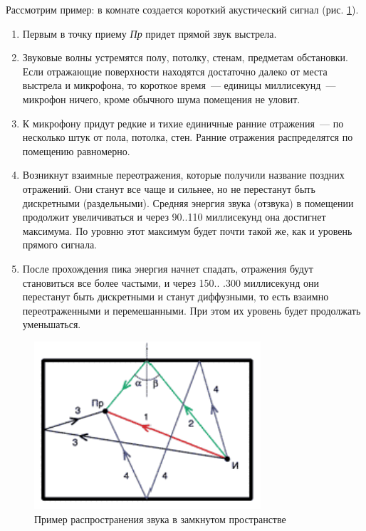 \documentclass[oneside, final, 14pt]{extreport}
\begin{document}
Рассмотрим пример: в комнате создается короткий акустический сигнал (рис. \ref{pic-acoustic-01}).
\begin{enumerate}
  \item Первым в точку приему \emph{Пр} придет прямой звук выстрела.
  \item Звуковые волны устремятся полу, потолку, стенам, предметам обстановки. Если отражающие поверхности находятся достаточно далеко от места выстрела и микрофона, то короткое время~--- единицы миллисекунд~--- микрофон ничего, кроме обычного шума помещения не уловит.
  \item К микрофону придут редкие и тихие единичные ранние отражения~--- по несколько штук от пола, потолка, стен. Ранние отражения распределятся по помещению равномерно.
  \item Возникнут взаимные переотражения, которые получили название поздних отражений. Они станут все чаще и сильнее, но не перестанут быть дискретными (раздельными). Средняя энергия звука (отзвука) в помещении продолжит увеличиваться и через 90..110 миллисекунд она достигнет максимума. По уровню этот максимум будет почти такой же, как и уровень прямого сигнала.
  \item После прохождения пика энергия начнет спадать, отражения будут становиться все более частыми, и через 150.. .300 миллисекунд они перестанут быть дискретными и станут диффузными, то есть взаимно переотраженными и перемешанными. При этом их уровень будет продолжать уменьшаться.
\end{enumerate}

\begin{figure}[h!]
  \centering
  \includegraphics[width=0.75\textwidth]{pic-acoustic-01}
  \caption{Пример распространения звука в замкнутом пространстве}
  \label{pic-acoustic-01}
\end{figure}
\end{document}
